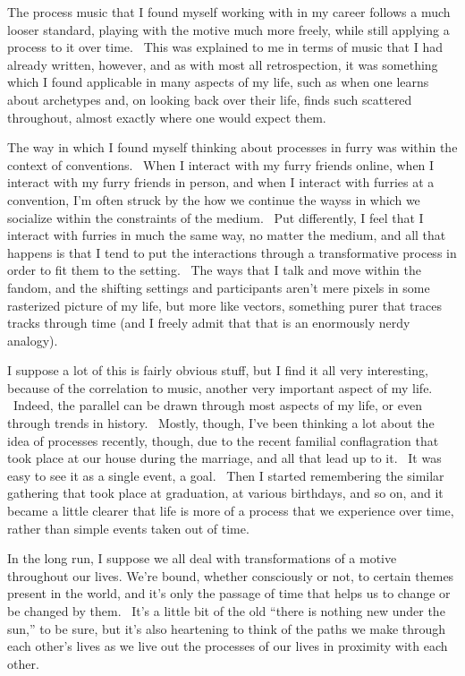 The process music that I found myself working with in my career follows
a much looser standard, playing with the motive much more freely, while
still applying a process to it over time. ~This was explained to me in
terms of music that I had already written, however, and as with most all
retrospection, it was something which I found applicable in many aspects
of my life, such as when one learns about archetypes and, on looking
back over their life, finds such scattered throughout, almost exactly
where one would expect them.

The way in which I found myself thinking about processes in furry was
within the context of conventions. ~When I interact with my furry
friends online, when I interact with my furry friends in person, and
when I interact with furries at a convention, I'm often struck by the
how we continue the wayss in which we socialize within the constraints
of the medium. ~Put differently, I feel that I interact with furries in
much the same way, no matter the medium, and all that happens is that I
tend to put the interactions through a transformative process in order
to fit them to the setting. ~The ways that I talk and move within the
fandom, and the shifting settings and participants aren't mere pixels in
some rasterized picture of my life, but more like vectors, something
purer that traces tracks through time (and I freely admit that that is
an enormously nerdy analogy).

I suppose a lot of this is fairly obvious stuff, but I find it all very
interesting, because of the correlation to music, another very important
aspect of my life. ~Indeed, the parallel can be drawn through most
aspects of my life, or even through trends in history. ~Mostly, though,
I've been thinking a lot about the idea of processes recently, though,
due to the recent familial conflagration that took place at our house
during the marriage, and all that lead up to it. ~It was easy to see it
as a single event, a goal. ~Then I started remembering the similar
gathering that took place at graduation, at various birthdays, and so
on, and it became a little clearer that life is more of a process that
we experience over time, rather than simple events taken out of time.

In the long run, I suppose we all deal with transformations of a motive
throughout our lives. We're bound, whether consciously or not, to
certain themes present in the world, and it's only the passage of time
that helps us to change or be changed by them. ~It's a little bit of the
old ``there is nothing new under the sun,'' to be sure, but it's also
heartening to think of the paths we make through each other's lives as
we live out the processes of our lives in proximity with each other.

